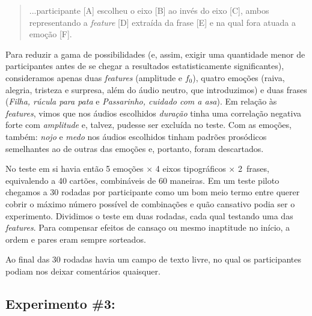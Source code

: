 \documentclass[a4paper]{tufte-handout}
\begin{document}
\begin{quote}
    ...participante [A] escolheu o eixo [B] ao invés do eixo [C], ambos representando a \textit{feature} [D] extraída da frase [E] e na qual fora atuada a emoção [F].
\end{quote}

Para reduzir a gama de possibilidades (e, assim, exigir uma quantidade menor de participantes antes de se chegar a resultados estatisticamente significantes), consideramos apenas duas \textit{features} (amplitude e $f_0$), quatro emoções (raiva, alegria, tristeza e surpresa, além do áudio neutro, que introduzimos) e duas frases (\textit{Filha, rúcula para pata} e \textit{Passarinho, cuidado com a asa}). Em relação às \textit{features}, vimos que nos áudios escolhidos \textit{duração} tinha uma correlação negativa forte com \textit{amplitude} e, talvez, pudesse ser excluída no teste. Com as emoções, também: \textit{nojo} e \textit{medo} nos áudios escolhidos tinham padrões prosódicos semelhantes ao de outras das emoções e, portanto, foram descartados.

No teste em si havia então 5 emoções × 4 eixos tipográficos × 2~frases, equivalendo a 40 cartões, combináveis de 60 maneiras. Em um teste piloto chegamos a 30 rodadas por participante como um bom meio termo entre querer cobrir o máximo número possível de combinações e quão cansativo podia ser o experimento. Dividimos o teste em duas rodadas, cada qual testando uma das \textit{features}. Para compensar efeitos de cansaço ou mesmo inaptitude no início, a ordem e pares eram sempre sorteados.

Ao final das 30 rodadas havia um campo de texto livre, no qual os participantes podiam nos deixar comentários quaisquer.

\subsection{Experimento \#3: }\label{sec:met_exp_3}
\end{document}
